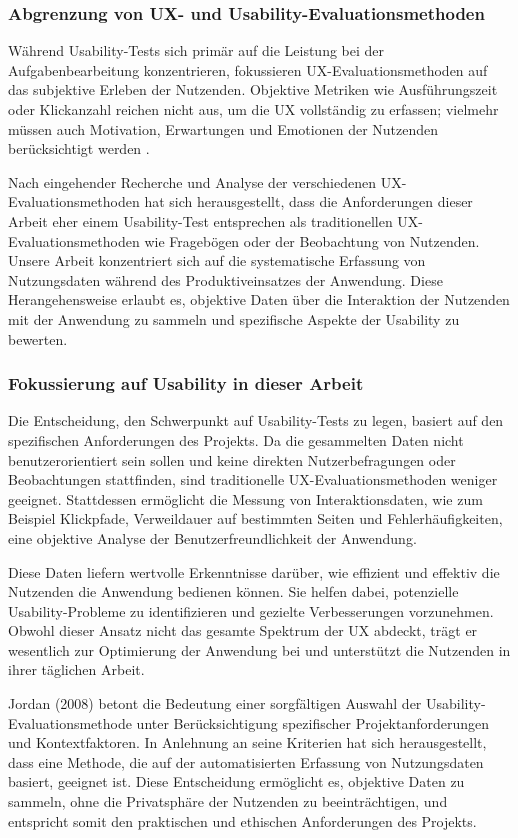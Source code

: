 \documentclass[12pt,oneside]{article}
\begin{document}
\subsubsection{Abgrenzung von UX- und Usability-Evaluationsmethoden}
Während Usability-Tests sich primär auf die Leistung bei der Aufgabenbearbeitung konzentrieren, fokussieren UX-Evaluationsmethoden auf das subjektive Erleben der Nutzenden. Objektive Metriken wie Ausführungszeit oder Klickanzahl reichen nicht aus, um die UX vollständig zu erfassen; vielmehr müssen auch Motivation, Erwartungen und Emotionen der Nutzenden berücksichtigt werden \cite{dev}.

Nach eingehender Recherche und Analyse der verschiedenen UX-Evaluationsmethoden hat sich herausgestellt, dass die Anforderungen dieser Arbeit eher einem Usability-Test entsprechen als traditionellen UX-Evaluationsmethoden wie Fragebögen oder der Beobachtung von Nutzenden. Unsere Arbeit konzentriert sich auf die systematische Erfassung von Nutzungsdaten während des Produktiveinsatzes der Anwendung. Diese Herangehensweise erlaubt es, objektive Daten über die Interaktion der Nutzenden mit der Anwendung zu sammeln und spezifische Aspekte der Usability zu bewerten.
\subsubsection{Fokussierung auf Usability in dieser Arbeit}
Die Entscheidung, den Schwerpunkt auf Usability-Tests zu legen, basiert auf den spezifischen Anforderungen des Projekts. Da die gesammelten Daten nicht benutzerorientiert sein sollen und keine direkten Nutzerbefragungen oder Beobachtungen stattfinden, sind traditionelle UX-Evaluationsmethoden weniger geeignet. Stattdessen ermöglicht die Messung von Interaktionsdaten, wie zum Beispiel Klickpfade, Verweildauer auf bestimmten Seiten und Fehlerhäufigkeiten, eine objektive Analyse der Benutzerfreundlichkeit der Anwendung.


Diese Daten liefern wertvolle Erkenntnisse darüber, wie effizient und effektiv die Nutzenden die Anwendung bedienen können. Sie helfen dabei, potenzielle Usability-Probleme zu identifizieren und gezielte Verbesserungen vorzunehmen. Obwohl dieser Ansatz nicht das gesamte Spektrum der UX abdeckt, trägt er wesentlich zur Optimierung der Anwendung bei und unterstützt die Nutzenden in ihrer täglichen Arbeit.

Jordan (2008)\cite{jordan2008auswahl} betont die Bedeutung einer sorgfältigen Auswahl der Usability-Evaluationsmethode unter Berücksichtigung spezifischer Projektanforderungen und Kontextfaktoren. In Anlehnung an seine Kriterien hat sich herausgestellt, dass eine Methode, die auf der automatisierten Erfassung von Nutzungsdaten basiert, geeignet ist. Diese Entscheidung ermöglicht es, objektive Daten zu sammeln, ohne die Privatsphäre der Nutzenden zu beeinträchtigen, und entspricht somit den praktischen und ethischen Anforderungen des Projekts.
\end{document}
